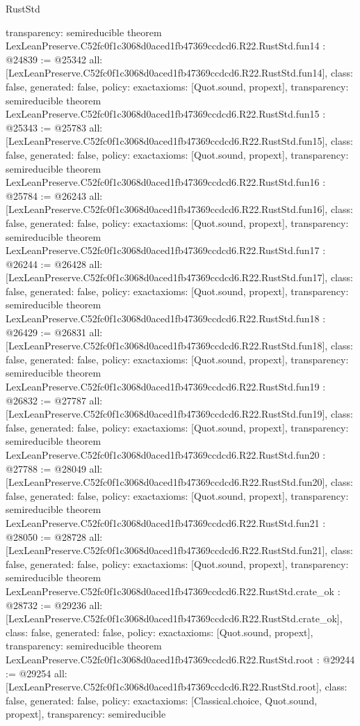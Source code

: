 \begin{lexlean}{RustStd}
\begin{coremodule}
{  transparency: semireducible
}
theorem LexLeanPreserve.C52fc0f1c3068d0aced1fb47369ccdcd6.R22.RustStd.fun14 : @24839 := @25342 {
  all: [LexLeanPreserve.C52fc0f1c3068d0aced1fb47369ccdcd6.R22.RustStd.fun14],
  class: false,
  generated: false,
  policy: exact{axioms: [Quot.sound, propext]},
  transparency: semireducible
}
theorem LexLeanPreserve.C52fc0f1c3068d0aced1fb47369ccdcd6.R22.RustStd.fun15 : @25343 := @25783 {
  all: [LexLeanPreserve.C52fc0f1c3068d0aced1fb47369ccdcd6.R22.RustStd.fun15],
  class: false,
  generated: false,
  policy: exact{axioms: [Quot.sound, propext]},
  transparency: semireducible
}
theorem LexLeanPreserve.C52fc0f1c3068d0aced1fb47369ccdcd6.R22.RustStd.fun16 : @25784 := @26243 {
  all: [LexLeanPreserve.C52fc0f1c3068d0aced1fb47369ccdcd6.R22.RustStd.fun16],
  class: false,
  generated: false,
  policy: exact{axioms: [Quot.sound, propext]},
  transparency: semireducible
}
theorem LexLeanPreserve.C52fc0f1c3068d0aced1fb47369ccdcd6.R22.RustStd.fun17 : @26244 := @26428 {
  all: [LexLeanPreserve.C52fc0f1c3068d0aced1fb47369ccdcd6.R22.RustStd.fun17],
  class: false,
  generated: false,
  policy: exact{axioms: [Quot.sound, propext]},
  transparency: semireducible
}
theorem LexLeanPreserve.C52fc0f1c3068d0aced1fb47369ccdcd6.R22.RustStd.fun18 : @26429 := @26831 {
  all: [LexLeanPreserve.C52fc0f1c3068d0aced1fb47369ccdcd6.R22.RustStd.fun18],
  class: false,
  generated: false,
  policy: exact{axioms: [Quot.sound, propext]},
  transparency: semireducible
}
theorem LexLeanPreserve.C52fc0f1c3068d0aced1fb47369ccdcd6.R22.RustStd.fun19 : @26832 := @27787 {
  all: [LexLeanPreserve.C52fc0f1c3068d0aced1fb47369ccdcd6.R22.RustStd.fun19],
  class: false,
  generated: false,
  policy: exact{axioms: [Quot.sound, propext]},
  transparency: semireducible
}
theorem LexLeanPreserve.C52fc0f1c3068d0aced1fb47369ccdcd6.R22.RustStd.fun20 : @27788 := @28049 {
  all: [LexLeanPreserve.C52fc0f1c3068d0aced1fb47369ccdcd6.R22.RustStd.fun20],
  class: false,
  generated: false,
  policy: exact{axioms: [Quot.sound, propext]},
  transparency: semireducible
}
theorem LexLeanPreserve.C52fc0f1c3068d0aced1fb47369ccdcd6.R22.RustStd.fun21 : @28050 := @28728 {
  all: [LexLeanPreserve.C52fc0f1c3068d0aced1fb47369ccdcd6.R22.RustStd.fun21],
  class: false,
  generated: false,
  policy: exact{axioms: [Quot.sound, propext]},
  transparency: semireducible
}
theorem LexLeanPreserve.C52fc0f1c3068d0aced1fb47369ccdcd6.R22.RustStd.crate_ok : @28732 := @29236 {
  all: [LexLeanPreserve.C52fc0f1c3068d0aced1fb47369ccdcd6.R22.RustStd.crate_ok],
  class: false,
  generated: false,
  policy: exact{axioms: [Quot.sound, propext]},
  transparency: semireducible
}
theorem LexLeanPreserve.C52fc0f1c3068d0aced1fb47369ccdcd6.R22.RustStd.root : @29244 := @29254 {
  all: [LexLeanPreserve.C52fc0f1c3068d0aced1fb47369ccdcd6.R22.RustStd.root],
  class: false,
  generated: false,
  policy: exact{axioms: [Classical.choice, Quot.sound, propext]},
  transparency: semireducible
}


\end{coremodule}
\end{lexlean}
